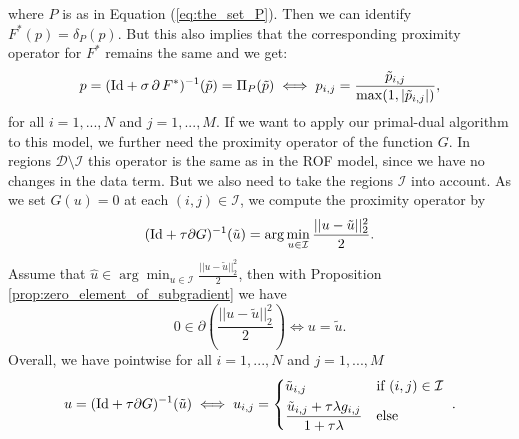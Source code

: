 \documentclass[abstracton]{scrreprt}
\begin{document}
        where $P$ is as in Equation (\ref{eq:the_set_P}). Then we can identify $F^{\ast}(p) = \delta_{P}(p)$. But this also implies that the corresponding proximity operator for $F^{\ast}$ remains the same and we get:
            \begin{equation}
                p = (\textnormal{Id} + \sigma\,\partial\,F^{\ast})^{-1}(\tilde{p}) = \Pi_{P}(\tilde{p}) \iff p_{i,j} = \frac{\tilde{p}_{i, j}}{\max(1, |\tilde{p}_{i, j}|)},
            \label{eq:proximity_operator_f_star_inpainting}
            \end{equation}
        for all $i = 1, ..., N$ and $j = 1, ..., M$. If we want to apply our primal-dual algorithm to this model, we further need the proximity operator of the function $G$. In regions $\mathcal{D} \setminus \mathcal{I}$ this operator is the same as in the ROF model, since we have no changes in the data term. But we also need to take the regions $\mathcal{I}$ into account. As we set $G(u) = 0$ at each $(i,j) \in \mathcal{I}$, we compute the proximity operator by
            $$
                (\textnormal{Id} + \tau \partial G)^{-1}(\tilde{u}) = \arg \min_{u \in \mathcal{I}} \frac{||u - \tilde{u}||_{2}^{2}}{2}.
            $$
        Assume that $\hat{u} \in \arg \min_{u \in \mathcal{I}} \frac{||u - \tilde{u}||_{2}^{2}}{2}$, then with Proposition \ref{prop:zero_element_of_subgradient} we have
            $$
                0 \in \partial \left( \frac{||u - \tilde{u}||_{2}^{2}}{2} \right) \iff u = \tilde{u}.
            $$
        Overall, we have pointwise for all $i = 1, ..., N$ and $j = 1, ..., M$
            \begin{equation}
                u = (\textnormal{Id} + \tau \partial G)^{-1}(\tilde{u}) \iff u_{i,j} =
                \begin{dcases*}
                    \tilde{u}_{i,j} & \textnormal{if $(i,j) \in \mathcal{I}$} \\
                    \frac{\tilde{u}_{i,j} + \tau \lambda g_{i,j}}{1 + \tau\lambda} & \textnormal{else}
                \end{dcases*}.
            \end{equation}
\end{document}
